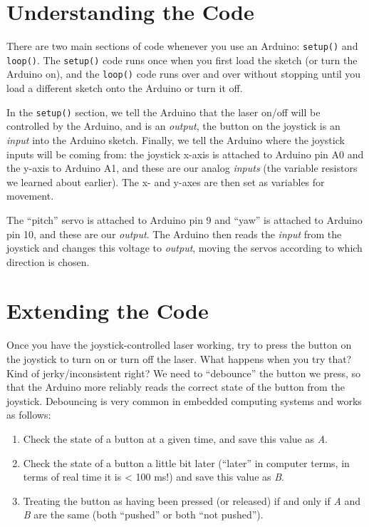 \documentclass{article}
\begin{document}
\section{Understanding the Code}
There are two main sections of code whenever you use an Arduino: \verb|setup()| and
\verb|loop()|. The \verb|setup()| code runs once when you first load the sketch (or
turn the Arduino on), and the \verb|loop()| code runs over and over without stopping
until you load a different sketch onto the Arduino or turn it off.

In the \verb|setup()| section, we tell the Arduino that the laser on/off will be
controlled by the Arduino, and is an \emph{output}, the button on the joystick is an
\emph{input} into the Arduino sketch. Finally, we tell the Arduino where the joystick
inputs will be coming from: the joystick x-axis is attached to Arduino pin A0 and the
y-axis to Arduino A1, and these are our analog \emph{inputs} (the variable resistors we
learned about earlier). The x- and y-axes are then set as variables for movement.

The ``pitch'' servo is attached to Arduino pin 9 and ``yaw'' is attached to Arduino
pin 10, and these are our \emph{output}. The Arduino then reads the \emph{input} from
the joystick and changes this voltage to \emph{output}, moving the servos according
to which direction is chosen.

\section{ Extending the Code}
Once you have the joystick-controlled laser working, try to press the button on the
joystick to turn on or turn off the laser. What happens when you try that? Kind of
jerky/inconsistent right?  We need to ``debounce'' the button we press, so that the
Arduino more reliably reads the correct state of the button from the
joystick. Debouncing is very common in embedded computing systems and works as
follows:

\begin{enumerate}
\item {Check the state of a button at a given time, and save this value as \emph{A}.}
\item {Check the state of a button a little bit later (``later'' in computer terms, in
    terms of real time it is < 100 ms!) and save this value as \emph{B}.}
\item {Treating the button as having been pressed (or released) if and only if
    \emph{A} and \emph{B} are the same (both ``pushed'' or both ``not pushed'').}
\end{enumerate}
\end{document}
